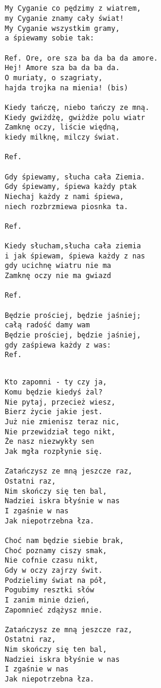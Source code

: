 \documentclass[12pt]{article}
\begin{document}
\subsection*{}
\begin{verbatim}
My Cyganie co pędzimy z wiatrem,
my Cyganie znamy cały świat!
My Cyganie wszystkim gramy,
a śpiewamy sobie tak:

Ref. Ore, ore sza ba da ba da amore.
Hej! Amore sza ba da ba da.
O muriaty, o szagriaty,
hajda trojka na mienia! (bis)

Kiedy tańczę, niebo tańczy ze mną.
Kiedy gwiżdżę, gwiżdże polu wiatr
Zamknę oczy, liście więdną,
kiedy milknę, milczy świat.

Ref.

Gdy śpiewamy, słucha cała Ziemia.
Gdy śpiewamy, śpiewa każdy ptak
Niechaj każdy z nami śpiewa,
niech rozbrzmiewa piosnka ta.

Ref.

Kiedy słucham,słucha cała ziemia
i jak śpiewam, śpiewa każdy z nas
gdy ucichnę wiatru nie ma
Zamknę oczy nie ma gwiazd

Ref.

Będzie prościej, będzie jaśniej;
całą radość damy wam
Będzie prościej, będzie jaśniej,
gdy zaśpiewa każdy z was:
Ref.
\end{verbatim}
\clearpage

\subsection*{}
\begin{verbatim}
Kto zapomni - ty czy ja,
Komu będzie kiedyś żal?
Nie pytaj, przecież wiesz,
Bierz życie jakie jest.
Już nie zmienisz teraz nic,
Nie przewidział tego nikt,
Że nasz niezwykły sen
Jak mgła rozpłynie się.

Zatańczysz ze mną jeszcze raz,
Ostatni raz,
Nim skończy się ten bal,
Nadziei iskra błyśnie w nas
I zgaśnie w nas
Jak niepotrzebna łza.

Choć nam będzie siebie brak,
Choć poznamy ciszy smak,
Nie cofnie czasu nikt,
Gdy w oczy zajrzy świt.
Podzielimy świat na pół,
Pogubimy resztki słów
I zanim minie dzień,
Zapomnieć zdążysz mnie.

Zatańczysz ze mną jeszcze raz,
Ostatni raz,
Nim skończy się ten bal,
Nadziei iskra błyśnie w nas
I zgaśnie w nas
Jak niepotrzebna łza.
\end{verbatim}
\clearpage
\end{document}

